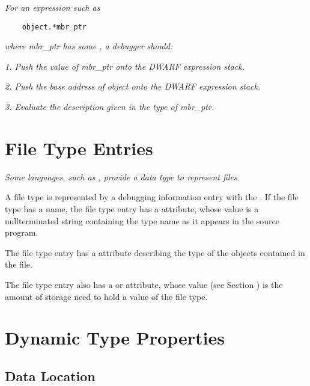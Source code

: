 \textit{For an expression such as}

\begin{lstlisting}
    object.*mbr_ptr
\end{lstlisting}
\textit{where mbr\_ptr has some , a debugger should:}

\textit{1. Push the value of mbr\_ptr onto the DWARF expression stack.}

\textit{2. Push the base address of object onto the DWARF expression stack.}

\textit{3. Evaluate the  description 
given in the type of mbr\_ptr.}

\section{File Type Entries}
\label{chap:filetypeentries}

\textit{Some languages, such as , 
provide a data type to represent 
files.}

A file type is represented by a debugging information entry
with 
the 
. 
If the file type has a name,
the file type entry has a  attribute,
whose value
is a null\dash terminated string containing the type name as it
appears in the source program.

The file type entry has 
a  attribute describing
the type of the objects contained in the file.

The file type entry also 
has 
a 
 or
 attribute, whose value 
(see Section )
is the amount of storage need to hold a value of the file type.

\section{Dynamic Type Properties}
\label{chap:dynamictypeproperties}
\subsection{Data Location}
\label{chap:datalocation}

